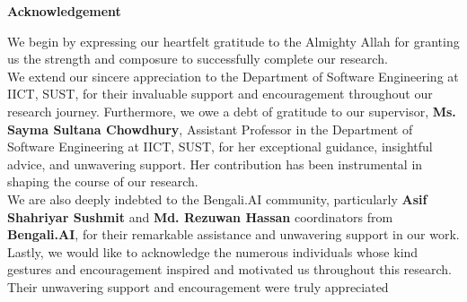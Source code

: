 
    \begin{center}
        \huge
        \textbf{Acknowledgement}
        \vspace{1cm}
    \end{center}
    
\begin{FlushLeft}
    \normalsize
We begin by expressing our heartfelt gratitude to the Almighty Allah for granting us the strength and composure to successfully complete our research. \\
    \vspace{0.5cm}
We extend our sincere appreciation to the Department of Software Engineering at IICT, SUST, for their invaluable support and encouragement throughout our research journey.
Furthermore, we owe a debt of gratitude to our supervisor, \textbf{Ms. Sayma Sultana Chowdhury}, Assistant Professor in the Department of Software Engineering at IICT, SUST, for her exceptional guidance, insightful advice, and unwavering support. Her contribution has been instrumental in shaping the course of our research.\\
    \vspace{0.5cm}
We are also deeply indebted to the Bengali.AI community, particularly \textbf{Asif Shahriyar Sushmit} and \textbf{Md. Rezuwan Hassan} coordinators from \textbf{Bengali.AI}, for their remarkable assistance and unwavering support in our work.\\
    \vspace{0.5cm}
Lastly, we would like to acknowledge the numerous individuals whose kind gestures and encouragement inspired and motivated us throughout this research. Their unwavering support and encouragement were truly appreciated


\end{FlushLeft}